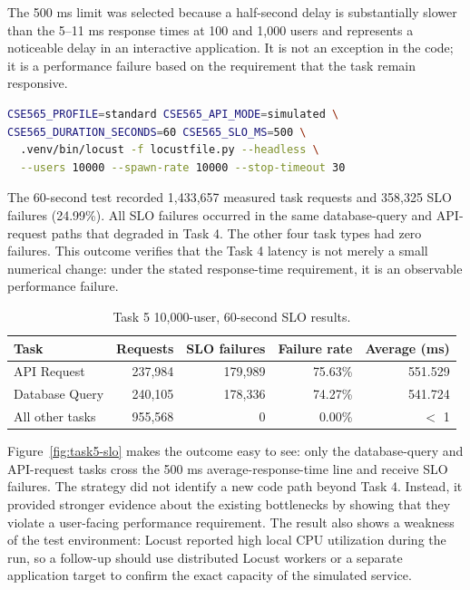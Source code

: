 \documentclass[11pt]{article}
\begin{document}
The 500 ms limit was selected because a half-second delay is substantially slower than the 5--11 ms response times at 100 and 1,000 users and represents a noticeable delay in an interactive application. It is not an exception in the code; it is a performance failure based on the requirement that the task remain responsive.

\begin{lstlisting}[style=code,language=bash]
CSE565_PROFILE=standard CSE565_API_MODE=simulated \
CSE565_DURATION_SECONDS=60 CSE565_SLO_MS=500 \
  .venv/bin/locust -f locustfile.py --headless \
  --users 10000 --spawn-rate 10000 --stop-timeout 30
\end{lstlisting}

The 60-second test recorded 1,433,657 measured task requests and 358,325 SLO failures (24.99\%). All SLO failures occurred in the same database-query and API-request paths that degraded in Task 4. The other four task types had zero failures. This outcome verifies that the Task 4 latency is not merely a small numerical change: under the stated response-time requirement, it is an observable performance failure.

\begin{table}[H]
\centering
\caption{Task 5 10,000-user, 60-second SLO results.}
\label{tab:task5-results}
\begin{tabular}{>{\raggedright\arraybackslash}p{1.3in}rrrr}
\toprule
\textbf{Task} & \textbf{Requests} & \textbf{SLO failures} & \textbf{Failure rate} & \textbf{Average (ms)} \\
\midrule
API Request & 237,984 & 179,989 & 75.63\% & 551.529 \\
Database Query & 240,105 & 178,336 & 74.27\% & 541.724 \\
All other tasks & 955,568 & 0 & 0.00\% & $<$ 1 \\
\bottomrule
\end{tabular}
\end{table}

Figure~\ref{fig:task5-slo} makes the outcome easy to see: only the database-query and API-request tasks cross the 500 ms average-response-time line and receive SLO failures. The strategy did not identify a new code path beyond Task 4. Instead, it provided stronger evidence about the existing bottlenecks by showing that they violate a user-facing performance requirement. The result also shows a weakness of the test environment: Locust reported high local CPU utilization during the run, so a follow-up should use distributed Locust workers or a separate application target to confirm the exact capacity of the simulated service.
\end{document}

